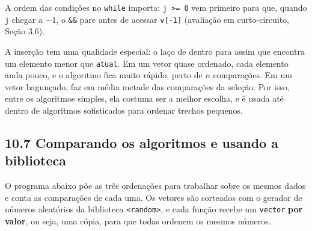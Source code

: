 A ordem das condições no \texttt{while} importa: \texttt{j >= 0} vem primeiro para que, quando \texttt{j} chegar a $-1$, o \texttt{\&\&} pare antes de acessar \texttt{v[-1]} (avaliação em curto-circuito, Seção 3.6).

A inserção tem uma qualidade especial: o laço de dentro para assim que encontra um elemento menor que \texttt{atual}. Em um vetor quase ordenado, cada elemento anda pouco, e o algoritmo fica muito rápido, perto de $n$ comparações. Em um vetor bagunçado, faz em média metade das comparações da seleção. Por isso, entre os algoritmos simples, ela costuma ser a melhor escolha, e é usada até dentro de algoritmos sofisticados para ordenar trechos pequenos.

\subsection{10.7 Comparando os algoritmos e usando a biblioteca}

O programa abaixo põe as três ordenações para trabalhar sobre os mesmos dados e conta as comparações de cada uma. Os vetores são sorteados com o gerador de números aleatórios da biblioteca \texttt{<random>}, e cada função recebe um \texttt{vector} \textbf{por valor}, ou seja, uma cópia, para que todas ordenem os mesmos números.

